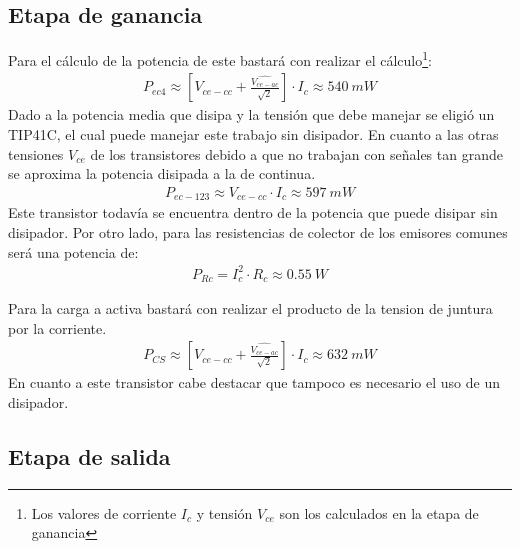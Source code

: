 \subsection{Etapa de ganancia}
Para el cálculo de la potencia de este bastará con realizar el cálculo\footnote{Los valores de corriente $I_c$ y tensión $V_{ce}$ son los calculados en la etapa de ganancia}:
\begin{align}
P_{ec4}\approx\left[V_{ce-cc} + \frac{\hat{V_{ce-ac}}}{\sqrt{2}}\right]\cdot I_c\approx 540 \ mW
\end{align}
Dado a la potencia media que disipa y la tensión que debe manejar se eligió un TIP41C, el cual puede manejar este trabajo sin disipador.
En cuanto a las otras tensiones $V_{ce}$ de los transistores debido a que no trabajan con señales tan grande se aproxima la potencia disipada a la de continua.
\begin{align}
P_{ec-123}\approx V_{ce-cc} \cdot I_c \approx 597 \ mW
\end{align}
Este transistor todavía se encuentra dentro de la potencia que puede disipar sin disipador.
Por otro lado, para las resistencias de colector de los emisores comunes será una potencia de:
\begin{align}
P_{Rc}= I_c^2 \cdot R_c \approx 0.55 \ W
\end{align}

Para la carga a activa bastará con realizar el producto de la tension de juntura por la corriente.
\begin{align}
P_{CS}\approx\left[V_{ce-cc} + \frac{\hat{V_{ce-ac}}}{\sqrt{2}}\right]\cdot I_c\approx  632\ mW
\end{align}
En cuanto a este transistor cabe destacar que tampoco es necesario el uso de un disipador.
\subsection{Etapa de salida}

%
